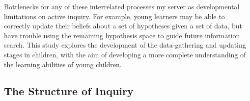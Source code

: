 \documentclass[10pt,letterpaper]{article}
\begin{document}
Bottlenecks for any of these interrelated processes my server as developmental limitations on active inquiry.  For example, young learners may be able to correctly update their beliefs about a set of hypotheses given a set of data, but have trouble using the remaining hypothesis space to guide future information search. This study explores the development of the data-gathering and updating stages in children, with the aim of developing a more complete understanding of the learning abilities of young children.


%

\subsection{The Structure of Inquiry}
\end{document}
